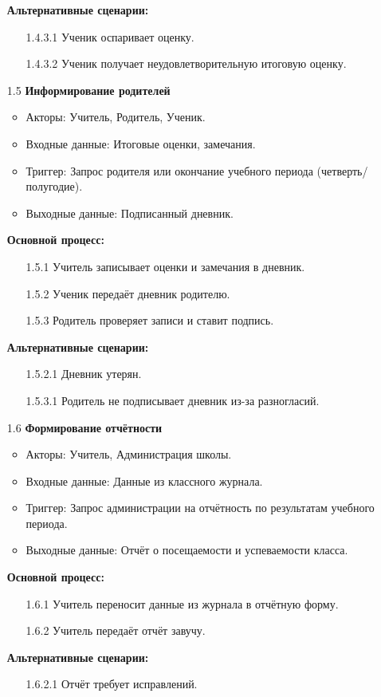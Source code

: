 \documentclass[a4paper, final]{article}
\begin{document}
\begin{enumerate}
  \textbf{Альтернативные сценарии:}
  \begin{itemize}
    \item[1.4.3.1] Ученик оспаривает оценку.
    \item[1.4.3.2] Ученик получает неудовлетворительную итоговую оценку. 
  \end{itemize}

  \item[1.5] \textbf{Информирование родителей}
  \begin{itemize}
    \item Акторы: Учитель, Родитель, Ученик.
    \item Входные данные: Итоговые оценки, замечания.
    \item Триггер: Запрос родителя или окончание учебного периода (четверть/полугодие).
    \item Выходные данные: Подписанный дневник.
  \end{itemize}

  \textbf{Основной процесс:}
  \begin{enumerate}
    \item[1.5.1] Учитель записывает оценки и замечания в дневник.
    \item[1.5.2] Ученик передаёт дневник родителю.
    \item[1.5.3] Родитель проверяет записи и ставит подпись.
  \end{enumerate}

  \textbf{Альтернативные сценарии:}
  \begin{itemize}
    \item[1.5.2.1] Дневник утерян.
    \item[1.5.3.1] Родитель не подписывает дневник из-за разногласий. 
  \end{itemize}
  

  \item[1.6] \textbf{Формирование отчётности}
  \begin{itemize}
    \item Акторы: Учитель, Администрация школы.
    \item Входные данные: Данные из классного журнала.
    \item Триггер: Запрос администрации на отчётность по результатам учебного периода.
    \item Выходные данные: Отчёт о посещаемости и успеваемости класса.
  \end{itemize}

  \textbf{Основной процесс:}
  \begin{enumerate}
    \item[1.6.1] Учитель переносит данные из журнала в отчётную форму.
    \item[1.6.2] Учитель передаёт отчёт завучу.
  \end{enumerate}

  \textbf{Альтернативные сценарии:}
  \begin{itemize}
    \item[1.6.2.1] Отчёт требует исправлений.
  \end{itemize}
\end{enumerate}
\end{document}
